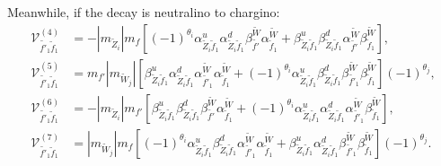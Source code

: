 \documentclass[final,3p,times,pdflatex]{elsarticle}
\begin{document}
Meanwhile, if the decay is neutralino to chargino:
\begin{align}
\mathcal{V}_{\tilde{f'}_1 \tilde{f}_1}^{(4)} &= -|m_{\tilde{Z}_i}|m_{f}\left[(-1)^{\theta_i}\alpha_{\tilde{Z}_i \tilde{f}_1}^{u} \alpha_{\tilde{Z}_i \tilde{f}_1}^{d} \beta_{\tilde{f'}}^{\tilde{W}}\alpha_{\tilde{f}_1}^{\tilde{W}} +  \beta_{\tilde{Z}_i \tilde{f}_1}^{u} \beta_{\tilde{Z}_i \tilde{f}_1}^{d} \alpha_{\tilde{f'}}^{\tilde{W}} \beta_{\tilde{f}_1}^{\tilde{W}}\right], \\
\mathcal{V}_{\tilde{f'}_1 \tilde{f}_1}^{(5)} &= m_{f'} |m_{\tilde{W}_j}|\left[\beta_{\tilde{Z}_i \tilde{f}_1}^{u} \alpha_{\tilde{Z}_i \tilde{f}_1}^{d} \alpha_{\tilde{f'}_1}^{\tilde{W}} \alpha_{\tilde{f}_1}^{\tilde{W}} + (-1)^{\theta_i} \alpha_{\tilde{Z}_i \tilde{f}_1}^{u} \beta_{\tilde{Z}_i \tilde{f}_1}^{d} \beta_{\tilde{f'}_1}^{\tilde{W}} \beta_{\tilde{f}_1}^{\tilde{W}}\right](-1)^{\theta_j}, \\
\mathcal{V}_{\tilde{f'}_1 \tilde{f}_1}^{(6)} &= -|m_{\tilde{Z}_i}| m_{f'} \left[\beta_{\tilde{Z}_i \tilde{f}_1}^{u} \beta_{\tilde{Z}_i \tilde{f}_1}^{d} \beta_{\tilde{f'}}^{\tilde{W}} \alpha_{\tilde{f}_1}^{\tilde{W}} + (-1)^{\theta_i}  \alpha_{\tilde{Z}_i \tilde{f}_1}^{u} \alpha_{\tilde{Z}_i \tilde{f}_1}^{d} \alpha_{\tilde{f'}_1}^{\tilde{W}} \beta_{\tilde{f}_1}^{\tilde{W}}\right], \\
\mathcal{V}_{\tilde{f'}_1 \tilde{f}_1}^{(7)} &= |m_{\tilde{W}_j}|m_{f}\left[(-1)^{\theta_i} \alpha_{\tilde{Z}_i \tilde{f}_1}^{u} \beta_{\tilde{Z}_i \tilde{f}_1}^{d} \alpha_{\tilde{f'}_1}^{\tilde{W}} \alpha_{\tilde{f}_1}^{\tilde{W}} + \beta_{\tilde{Z}_i \tilde{f}_1}^{u} \alpha_{\tilde{Z}_i \tilde{f}_1}^{d} \beta_{\tilde{f'}_1}^{\tilde{W}} \beta_{\tilde{f}_1}^{\tilde{W}}\right](-1)^{\theta_j}.
\end{align}
\end{document}
